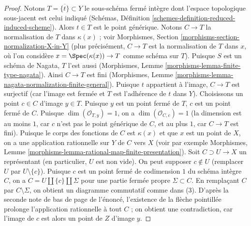 \begin{proof}
\medskip\noindent
Notons $T = \overline{\{t\}} \subset Y$ le sous-schéma fermé intègre
dont l'espace topologique sous-jacent est celui indiqué
(Schémas, Définition \ref{schemes-definition-reduced-induced-scheme}).
Alors $t \in T$ est le point générique.
Notons $C \to T$ la normalisation de $T$ dans $\kappa(x)$ ; voir
Morphismes, Section \ref{morphisms-section-normalization-X-in-Y}
(plus précisément, $C \to T$ est la normalisation de $T$ dans $x$,
où l'on considère $x = \Spec(\kappa(x)) \to T$ comme schéma sur $T$).
Puisque $S$ est un schéma de Nagata, $T$ l'est aussi
(Morphismes, Lemme \ref{morphisms-lemma-finite-type-nagata}).
Ainsi $C \to T$ est fini
(Morphismes, Lemme \ref{morphisms-lemma-nagata-normalization-finite-general}).
Puisque $t$ appartient à l'image, $C \to T$ est surjectif (car
l'image est fermée et $T$ est l'adhérence de $t$ dans $Y$).
Choisissons un point $c \in C$ d'image $y \in T$.
Puisque $y$ est un point fermé de $T$, $c$ est
un point fermé de $C$. Puisque $\dim(\mathcal{O}_{T, y}) = 1$,
on a $\dim(\mathcal{O}_{C, c}) = 1$ (la dimension est
au moins $1$, car $c$ n'est pas le point générique de $C$, et
au plus $1$, car $C \to T$ est fini).
Puisque le corps des fonctions de $C$ est $\kappa(x)$ et que $x$
est un point de $X$, on a une application rationnelle sur $Y$ de $C$ vers $X$
(voir par exemple Morphismes, Lemme
\ref{morphisms-lemma-rational-map-finite-presentation}).
Soit $C \supset U \to X$ un représentant (en particulier, $U$ est non vide).
On peut supposer $c \not \in U$ (remplacer $U$ par $U \setminus \{c\}$).
Puisque $c$ est un point fermé de codimension $1$ du schéma intègre $C$,
on a $C = U \amalg \{c\} \amalg \Sigma$
pour une partie fermée propre $\Sigma \subset C$.
En remplaçant $C$ par $C \setminus \Sigma$,
on obtient un diagramme commutatif comme dans (3).
D'après la seconde note de bas de page de l'énoncé,
l'existence de la flèche pointillée prolonge
l'application rationnelle à tout $C$ ; on obtient une contradiction,
car l'image de $c$ est alors un point de $Z$ d'image $y$.
\end{proof}

